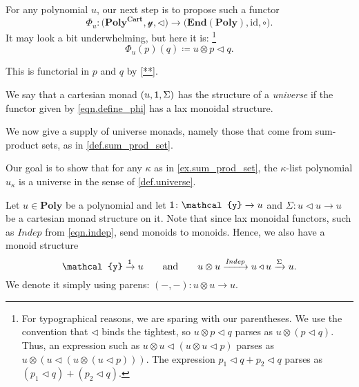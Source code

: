 \documentclass[11pt, one side, article]{memoir}
\theoremstyle{definition}
\theoremstyle{plain}
\newenvironment{definition}
  {\pushQED{\qed}\renewcommand{\qedsymbol}{$\lozenge$}\definitionx}
  {\popQED\enddefinitionx}
\newcommand{\Cat}[1]{\mathbf{#1}}%
\newcommand{\Fun}[1]{\mathit{#1}}%
\newcommand{\id}{\mathrm{id}}
\newcommand{\too}{\longrightarrow}
\newcommand{\To}[2][]{\xrightarrow[#1]{#2}}
\newcommand{\en}{\Cat{End}}
\newcommand{\yon}{\mathcal{y}}
\newcommand{\poly}{\Cat{Poly}}
\newcommand{\polycart}{\poly^{\Cat{Cart}}}
\newcommand{\0}{\textsf{0}}
\newcommand{\1}{\tn{\textsf{1}}}
\newcommand{\tri}{\mathbin{\triangleleft}}
\newcommand{\indep}{\Fun{Indep}}
\newcommand{\qqand}{\qquad\text{and}\qquad}
\begin{document}
For any polynomial $u$, our next step is to propose such a functor
\[
	\Phi_u\colon\Big(\polycart,\yon,\tri\Big)\too\Big(\en(\poly),\id,\circ\Big).
\]
It may look a bit underwhelming, but here it is:%
\footnote{For typographical reasons, we are sparing with our parentheses. We use the convention that $\tri$ binds the tightest, so $u\otimes p\tri q$ parses as $u\otimes(p\tri q)$. Thus, an expression such as $u\otimes u\tri(u\otimes u\tri p)$ parses as $u\otimes(u\tri(u\otimes(u\tri p)))$. The expression $p_1\tri q+p_2\tri q$ parses as $(p_1\tri q)+(p_2\tri q)$.}
\begin{equation}\label{eqn.define_phi}
	\Phi_u(p)(q)\coloneqq u\otimes p\tri q.
\end{equation}

This is functorial in $p$ and $q$ by \cref{**}.

\begin{definition}[Universe monads]\label{def.universe}
We say that a cartesian monad $(u,\1,\Sigma)$ has the structure of a \emph{universe} if the functor given by \eqref{eqn.define_phi} has a lax monoidal structure.
\end{definition}

We now give a supply of universe monads, namely those that come from sum-product sets, as in \cref{def.sum_prod_set}.

Our goal is to show that for any $\kappa$ as in \cref{ex.sum_prod_set}, the $\kappa$-list polynomial $u_\kappa$ is a universe in the sense of \cref{def.universe}.

Let $u\in\poly$ be a polynomial and let $\1\colon\yon\to u$ and $\Sigma\colon u\tri u\to u$ be a cartesian monad structure on it. Note that since lax monoidal functors, such as $\indep$ from \eqref{eqn.indep}, send monoids to monoids. Hence, we also have a monoid structure 
\begin{equation}\label{eqn.otimes_monoid}
	\yon\To{\1} u
	\qqand
	u\otimes u\To{\indep} u\tri u\To{\Sigma}u.
\end{equation}
We denote it simply using parens: $(-,-)\colon u\otimes u\to u$.
\end{document}
